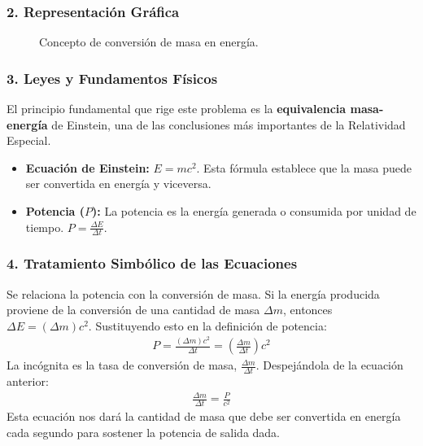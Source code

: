\subsubsection*{2. Representación Gráfica}
\begin{figure}[H]
    \centering
    \caption{Concepto de conversión de masa en energía.}
\end{figure}

\subsubsection*{3. Leyes y Fundamentos Físicos}
El principio fundamental que rige este problema es la \textbf{equivalencia masa-energía} de Einstein, una de las conclusiones más importantes de la Relatividad Especial.
\begin{itemize}
    \item \textbf{Ecuación de Einstein:} $E = m c^2$. Esta fórmula establece que la masa puede ser convertida en energía y viceversa.
    \item \textbf{Potencia ($P$):} La potencia es la energía generada o consumida por unidad de tiempo. $P = \frac{\Delta E}{\Delta t}$.
\end{itemize}

\subsubsection*{4. Tratamiento Simbólico de las Ecuaciones}
Se relaciona la potencia con la conversión de masa. Si la energía producida proviene de la conversión de una cantidad de masa $\Delta m$, entonces $\Delta E = (\Delta m) c^2$.
Sustituyendo esto en la definición de potencia:
\begin{gather}
    P = \frac{(\Delta m) c^2}{\Delta t} = \left(\frac{\Delta m}{\Delta t}\right) c^2
\end{gather}
La incógnita es la tasa de conversión de masa, $\frac{\Delta m}{\Delta t}$. Despejándola de la ecuación anterior:
\begin{gather}
    \frac{\Delta m}{\Delta t} = \frac{P}{c^2}
\end{gather}
Esta ecuación nos dará la cantidad de masa que debe ser convertida en energía cada segundo para sostener la potencia de salida dada.

